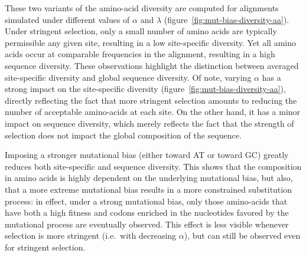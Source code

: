 These two variants of the amino-acid diversity are computed for alignments simulated under different values of $\alpha$ and $\lambda$ (figure~\ref{fig:mut-bias-diversity-aa}).
Under stringent selection, only a small number of amino acids are typically permissible any given site, resulting in a low site-specific diversity.
Yet all amino acids occur at comparable frequencies in the alignment, resulting in a high sequence diversity.
These observations highlight the distinction between averaged site-specific diversity and global sequence diversity.
Of note, varying $\alpha$ has a strong impact on the site-specific diversity (figure~\ref{fig:mut-bias-diversity-aa}), directly reflecting the fact that more stringent selection amounts to reducing the number of acceptable amino-acids at each site.
On the other hand, it has a minor impact on sequence diversity, which merely reflects the fact that the strength of selection does not impact the global composition of the sequence.

Imposing a stronger mutational bias (either toward AT or toward GC) greatly reduces both site-specific and sequence diversity.
This shows that the composition in amino acids is highly dependent on the underlying mutational bias, but also, that a more extreme mutational bias results in a more constrained \gls{substitution} process: in effect, under a strong mutational bias, only those amino-acids that have both a high fitness and \glspl{codon} enriched in the nucleotides favored by the mutational process are eventually observed.
This effect is less visible whenever selection is more stringent (i.e.~with decreasing $\alpha$), but can still be observed even for stringent selection.

